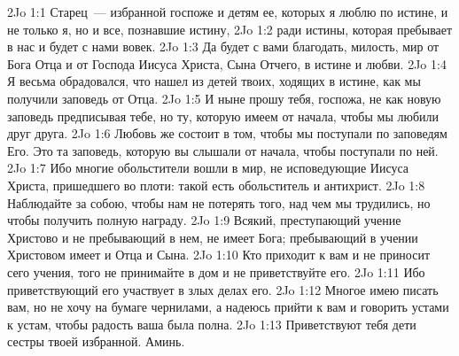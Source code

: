 \vs 2Jo 1:1 Старец~--- избранной госпоже и детям ее, которых я люблю по истине, и не только я, но и все, познавшие истину,
\vs 2Jo 1:2 ради истины, которая пребывает в нас и будет с нами вовек.
\vs 2Jo 1:3 Да будет с вами благодать, милость, мир от Бога Отца и от Господа Иисуса Христа, Сына Отчего, в истине и любви.
\rsbpar\vs 2Jo 1:4 Я весьма обрадовался, что нашел из детей твоих, ходящих в истине, как мы получили заповедь от Отца.
\vs 2Jo 1:5 И ныне прошу тебя, госпожа, не как новую заповедь предписывая тебе, но ту, которую имеем от начала, чтобы мы любили друг друга.
\vs 2Jo 1:6 Любовь же состоит в том, чтобы мы поступали по заповедям Его. Это та заповедь, которую вы слышали от начала, чтобы поступали по ней.
\vs 2Jo 1:7 Ибо многие обольстители вошли в мир, не исповедующие Иисуса Христа, пришедшего во плоти: такой  есть обольститель и антихрист.
\vs 2Jo 1:8 Наблюдайте за собою, чтобы нам не потерять того, над чем мы трудились, но чтобы получить полную награду.
\vs 2Jo 1:9 Всякий, преступающий учение Христово и не пребывающий в нем, не имеет Бога; пребывающий в учении Христовом имеет и Отца и Сына.
\vs 2Jo 1:10 Кто приходит к вам и не приносит сего учения, того не принимайте в дом и не приветствуйте его.
\vs 2Jo 1:11 Ибо приветствующий его участвует в злых делах его.
\rsbpar\vs 2Jo 1:12 Многое имею писать вам, но не хочу на бумаге чернилами, а надеюсь прийти к вам и говорить устами к устам, чтобы радость ваша была полна.
\vs 2Jo 1:13 Приветствуют тебя дети сестры твоей избранной. Аминь.
